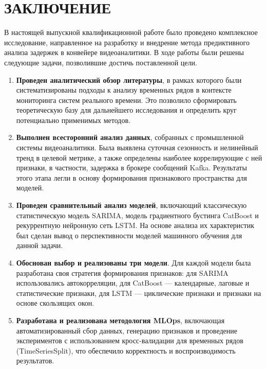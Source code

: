 \chapter*{ЗАКЛЮЧЕНИЕ}

\hspace*{1.25cm}В настоящей выпускной квалификационной работе было проведено комплексное исследование, направленное на разработку и внедрение метода предиктивного анализа задержек в конвейере видеоаналитики. В ходе работы были решены следующие задачи, позволившие достичь поставленной цели.

\begin{enumerate}
    \item \textbf{Проведен аналитический обзор литературы}, в рамках которого были систематизированы подходы к анализу временных рядов в контексте мониторинга систем реального времени. Это позволило сформировать теоретическую базу для дальнейшего исследования и определить круг потенциально применимых методов.

    \item \textbf{Выполнен всесторонний анализ данных}, собранных с промышленной системы видеоаналитики. Была выявлена суточная сезонность и нелинейный тренд в целевой метрике, а также определены наиболее коррелирующие с ней признаки, в частности, задержка в брокере сообщений Kafka. Результаты этого этапа легли в основу формирования признакового пространства для моделей.

    \item \textbf{Проведен сравнительный анализ моделей}, включающий классическую статистическую модель SARIMA, модель градиентного бустинга CatBoost и рекуррентную нейронную сеть LSTM. На основе анализа их характеристик был сделан вывод о перспективности моделей машинного обучения для данной задачи.

    \item \textbf{Обоснован выбор и реализованы три модели}. Для каждой модели была разработана своя стратегия формирования признаков: для SARIMA использовались автокорреляции, для CatBoost — календарные, лаговые и статистические признаки, для LSTM — циклические признаки и признаки на основе скользящих окон.

    \item \textbf{Разработана и реализована методология MLOps}, включающая автоматизированный сбор данных, генерацию признаков и проведение экспериментов с использованием кросс-валидации для временных рядов (TimeSeriesSplit), что обеспечило корректность и воспроизводимость результатов.


\end{enumerate}
